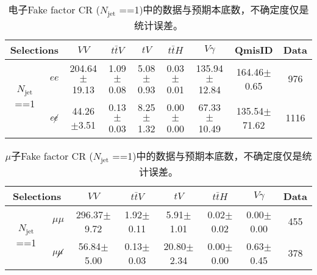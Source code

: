 \begin{table}[!ht]
\scriptsize
\centering
\begin{tabular}{c|c|cccc|c|c|c}
\hline
\hline
\multicolumn{2}{c|}{ Selections} &$VV$  &$t\bar{t}V$    &$tV$    &$t\bar{t}H$     &$V\gamma$  &QmisID  &Data \\
\hline
\multirow{2}{*}{$N_\text{jet}$ ==1}  &$ee$  &204.64$\pm$19.13 &1.09$\pm$0.08&5.08$\pm$0.93&0.03$\pm$0.01&135.94$\pm$12.84&164.46$\pm$0.65 &976\\
\cline{2-9}
                &$e\cancel{e}$ &44.26$\pm$3.51    &0.13$\pm$0.03  &8.25$\pm$1.32 &0.00$\pm$0.00  &67.33$\pm$10.49  &135.54$\pm$71.62    &1116\\
\hline
\hline
\end{tabular}
\caption{电子Fake factor CR ($N_\text{jet}$ ==1)中的数据与预期本底数，不确定度仅是统计误差。}
\label{tab:ff_ele_CR_1jets}
\end{table}

\begin{table}[!ht]
\scriptsize
\centering
\begin{tabular}{c|c|cccc|c|c}
\hline
\hline
\multicolumn{2}{c|}{ Selections} &$VV$  &$t\bar{t}V$    &$tV$    &$t\bar{t}H$     &$V\gamma$    &Data \\
\hline
\multirow{2}{*}{$N_\text{jet}$ ==1}  &$\mu\mu$ &296.37$\pm$9.72    &1.92$\pm$0.11    &5.91$\pm$1.01    &0.02$\pm$0.02    &0.00$\pm$0.00 &455\\
\cline{2-8}
                  &$\mu\cancel{\mu}$ &56.84$\pm$5.00    &0.13$\pm$0.03    &20.80$\pm$2.34    &0.00$\pm$0.00    &0.63$\pm$0.45    &378\\
\hline
\hline
\end{tabular}
\caption{$\mu$子Fake factor CR ($N_\text{jet}$ ==1)中的数据与预期本底数，不确定度仅是统计误差。}
\end{table}


